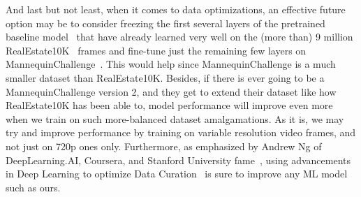 And last but not least, when it comes to data optimizations, an effective future option may be to consider freezing the first several layers of the pretrained baseline model~\cite{single_view_mpi} that have already learned very well on the (more than) 9 million RealEstate10K~\cite{zhou2018stereo} frames and fine-tune just the remaining few layers on MannequinChallenge~\cite{li2019learning}. This would help since MannequinChallenge is a much smaller dataset than RealEstate10K. Besides, if there is ever going to be a MannequinChallenge version 2, and they get to extend their dataset like how RealEstate10K has been able to, model performance will improve even more when we train on such more-balanced dataset amalgamations. As it is, we may try and improve performance by training on variable resolution video frames, and not just on 720p ones only. Furthermore, as emphasized by Andrew Ng of DeepLearning.AI, Coursera, and Stanford University fame~\cite{bescond_deep-dive_2021}, using advancements in Deep Learning to optimize Data Curation~\cite{thirumuruganathan_data_2019} is sure to improve any ML model such as ours.